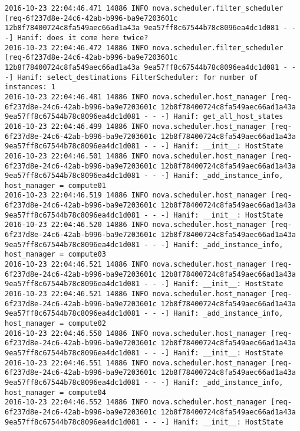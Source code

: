 \begin{lstlisting}[frame=single, caption={The filter scheduler code trace log}, label={lst:filterschedulercodetracelog}]
2016-10-23 22:04:46.471 14886 INFO nova.scheduler.filter_scheduler [req-6f237d8e-24c6-42ab-b996-ba9e7203601c 12b8f78400724c8fa549aec66ad1a43a 9ea57ff8c67544b78c8096ea4dc1d081 - - -] Hanif: does it come here twice?
2016-10-23 22:04:46.472 14886 INFO nova.scheduler.filter_scheduler [req-6f237d8e-24c6-42ab-b996-ba9e7203601c 12b8f78400724c8fa549aec66ad1a43a 9ea57ff8c67544b78c8096ea4dc1d081 - - -] Hanif: select_destinations FilterScheduler: for number of instances: 1
2016-10-23 22:04:46.481 14886 INFO nova.scheduler.host_manager [req-6f237d8e-24c6-42ab-b996-ba9e7203601c 12b8f78400724c8fa549aec66ad1a43a 9ea57ff8c67544b78c8096ea4dc1d081 - - -] Hanif: get_all_host_states
2016-10-23 22:04:46.499 14886 INFO nova.scheduler.host_manager [req-6f237d8e-24c6-42ab-b996-ba9e7203601c 12b8f78400724c8fa549aec66ad1a43a 9ea57ff8c67544b78c8096ea4dc1d081 - - -] Hanif: __init__: HostState
2016-10-23 22:04:46.501 14886 INFO nova.scheduler.host_manager [req-6f237d8e-24c6-42ab-b996-ba9e7203601c 12b8f78400724c8fa549aec66ad1a43a 9ea57ff8c67544b78c8096ea4dc1d081 - - -] Hanif: _add_instance_info, host_manager = compute01
2016-10-23 22:04:46.519 14886 INFO nova.scheduler.host_manager [req-6f237d8e-24c6-42ab-b996-ba9e7203601c 12b8f78400724c8fa549aec66ad1a43a 9ea57ff8c67544b78c8096ea4dc1d081 - - -] Hanif: __init__: HostState
2016-10-23 22:04:46.520 14886 INFO nova.scheduler.host_manager [req-6f237d8e-24c6-42ab-b996-ba9e7203601c 12b8f78400724c8fa549aec66ad1a43a 9ea57ff8c67544b78c8096ea4dc1d081 - - -] Hanif: _add_instance_info, host_manager = compute03
2016-10-23 22:04:46.521 14886 INFO nova.scheduler.host_manager [req-6f237d8e-24c6-42ab-b996-ba9e7203601c 12b8f78400724c8fa549aec66ad1a43a 9ea57ff8c67544b78c8096ea4dc1d081 - - -] Hanif: __init__: HostState
2016-10-23 22:04:46.521 14886 INFO nova.scheduler.host_manager [req-6f237d8e-24c6-42ab-b996-ba9e7203601c 12b8f78400724c8fa549aec66ad1a43a 9ea57ff8c67544b78c8096ea4dc1d081 - - -] Hanif: _add_instance_info, host_manager = compute02
2016-10-23 22:04:46.550 14886 INFO nova.scheduler.host_manager [req-6f237d8e-24c6-42ab-b996-ba9e7203601c 12b8f78400724c8fa549aec66ad1a43a 9ea57ff8c67544b78c8096ea4dc1d081 - - -] Hanif: __init__: HostState
2016-10-23 22:04:46.551 14886 INFO nova.scheduler.host_manager [req-6f237d8e-24c6-42ab-b996-ba9e7203601c 12b8f78400724c8fa549aec66ad1a43a 9ea57ff8c67544b78c8096ea4dc1d081 - - -] Hanif: _add_instance_info, host_manager = compute04
2016-10-23 22:04:46.552 14886 INFO nova.scheduler.host_manager [req-6f237d8e-24c6-42ab-b996-ba9e7203601c 12b8f78400724c8fa549aec66ad1a43a 9ea57ff8c67544b78c8096ea4dc1d081 - - -] Hanif: __init__: HostState

\end{lstlisting}
